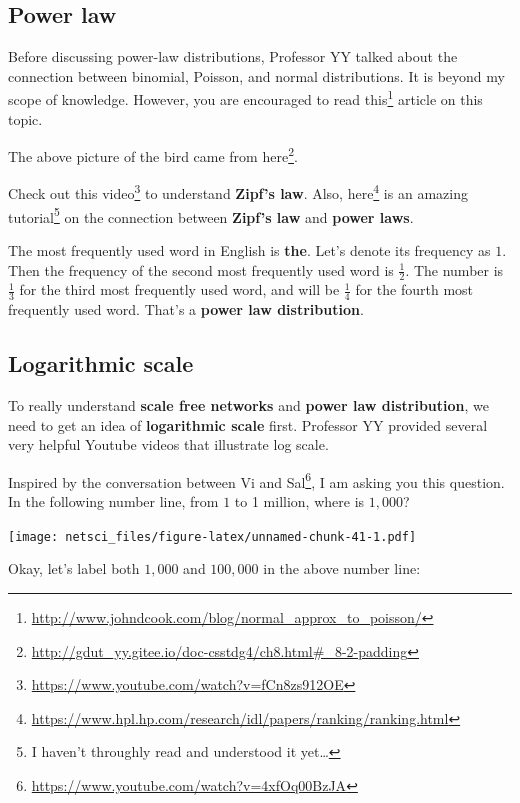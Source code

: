 \documentclass[
]{krantz}
\makeatletter
\renewcommand{\href}[2]{#2\footnote{\url{#1}}}
\newenvironment{kframe}{%
\medskip{}
\setlength{\fboxsep}{.8em}
 \def\at@end@of@kframe{}%
 \ifinner\ifhmode%
  \def\at@end@of@kframe{\end{minipage}}%
  \begin{minipage}{\columnwidth}%
 \fi\fi%
 \def\FrameCommand##1{\hskip\@totalleftmargin \hskip-\fboxsep
 \colorbox{shadecolor}{##1}\hskip-\fboxsep
     \hskip-\linewidth \hskip-\@totalleftmargin \hskip\columnwidth}%
 \MakeFramed {\advance\hsize-\width
   \@totalleftmargin\z@ \linewidth\hsize
   \@setminipage}}%
 {\par\unskip\endMakeFramed%
 \at@end@of@kframe}
\newenvironment{rmdblock}[1]
  {
  \begin{itemize}
  \renewcommand{\labelitemi}{
    \raisebox{-.7\height}[0pt][0pt]{
      {\setkeys{Gin}{width=3em,keepaspectratio}\texttt{[image: images/\#1]}}
    }
  }
  \setlength{\fboxsep}{1em}
  \begin{kframe}
  \item
  }
  {
  \end{kframe}
  \end{itemize}
  }
\newenvironment{rmdreminder}
  {\begin{rmdblock}{reminder}}
  {\end{rmdblock}}
\makeatother
\begin{document}
\hypertarget{power-law}{%
\subsection{Power law}\label{power-law}}

\begin{rmdreminder}
Before discussing power-law distributions, Professor YY talked about the connection between binomial, Poisson, and normal distributions. It is beyond my scope of knowledge. However, you are encouraged to read \href{http://www.johndcook.com/blog/normal_approx_to_poisson/}{this} article on this topic.
\end{rmdreminder}

The above picture of the bird came from \href{http://gdut_yy.gitee.io/doc-csstdg4/ch8.html\#_8-2-padding}{here}.

Check out \href{https://www.youtube.com/watch?v=fCn8zs912OE}{this video} to understand \textbf{Zipf's law}. Also, \href{https://www.hpl.hp.com/research/idl/papers/ranking/ranking.html}{here} is an amazing tutorial\footnote{I haven't throughly read and understood it yet\ldots{}} on the connection between \textbf{Zipf's law} and \textbf{power laws}.

The most frequently used word in English is \textbf{the}. Let's denote its frequency as \(1\). Then the frequency of the second most frequently used word is \(\frac{1}{2}\). The number is \(\frac{1}{3}\) for the third most frequently used word, and will be \(\frac{1}{4}\) for the fourth most frequently used word. That's a \textbf{power law distribution}.

\hypertarget{logarithmic-scale}{%
\subsection{Logarithmic scale}\label{logarithmic-scale}}

To really understand \textbf{scale free networks} and \textbf{power law distribution}, we need to get an idea of \textbf{logarithmic scale} first. Professor YY provided several very helpful Youtube videos that illustrate log scale.

Inspired by \href{https://www.youtube.com/watch?v=4xfOq00BzJA}{the conversation between Vi and Sal}, I am asking you this question. In the following number line, from \(1\) to 1 million, where is \(1,000\)?

\texttt{[image: netsci\_files/figure-latex/unnamed-chunk-41-1.pdf]}

Okay, let's label both \(1,000\) and \(100,000\) in the above number line:
\end{document}
